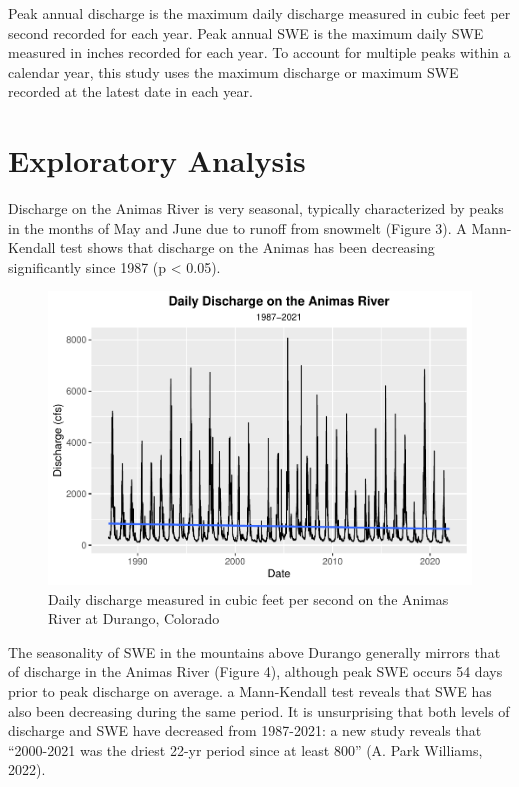 \documentclass[
  12pt,
]{article}
\begin{document}
Peak annual discharge is the maximum daily discharge measured in cubic
feet per second recorded for each year. Peak annual SWE is the maximum
daily SWE measured in inches recorded for each year. To account for
multiple peaks within a calendar year, this study uses the maximum
discharge or maximum SWE recorded at the latest date in each year.

\newpage

\hypertarget{exploratory-analysis}{%
\section{Exploratory Analysis}\label{exploratory-analysis}}

Discharge on the Animas River is very seasonal, typically characterized
by peaks in the months of May and June due to runoff from snowmelt
(Figure 3). A Mann-Kendall test shows that discharge on the Animas has
been decreasing significantly since 1987 (p \textless{} 0.05).

\begin{figure}
\centering
\includegraphics{Final_Report_files/figure-latex/unnamed-chunk-2-1.pdf}
\caption{Daily discharge measured in cubic feet per second on the Animas
River at Durango, Colorado}
\end{figure}

\newpage

The seasonality of SWE in the mountains above Durango generally mirrors
that of discharge in the Animas River (Figure 4), although peak SWE
occurs 54 days prior to peak discharge on average. a Mann-Kendall test
reveals that SWE has also been decreasing during the same period. It is
unsurprising that both levels of discharge and SWE have decreased from
1987-2021: a new study reveals that ``2000-2021 was the driest 22-yr
period since at least 800'' (A. Park Williams, 2022).
\end{document}
